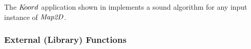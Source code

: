 \begin{theorem}
The $K\kern-2pt oord$ application shown in  implements a sound algorithm for any input instance of $\mathit{Map2D}$.
\end{theorem}

\subsubsection{External (Library) Functions}

